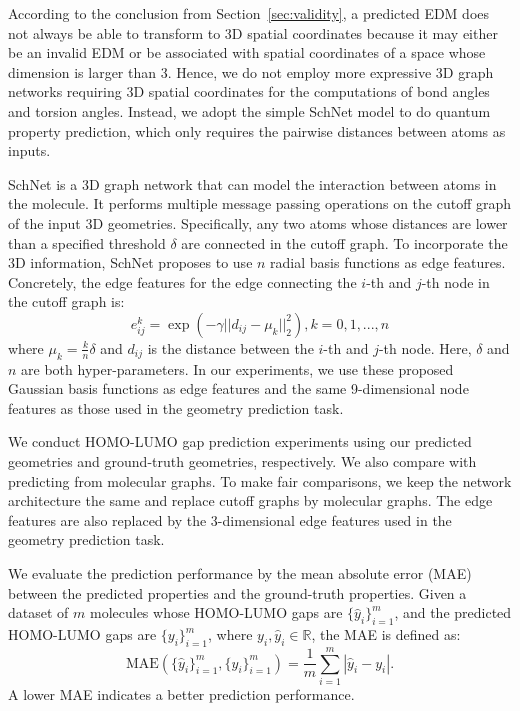 \documentclass{article}
\begin{document}
According to the conclusion from Section~\ref{sec:validity}, a predicted EDM does not always be able to transform to 3D spatial coordinates because it may either be an invalid EDM or be associated with spatial coordinates of a space whose dimension is larger than 3. Hence, we do not employ more expressive 3D graph networks requiring 3D spatial coordinates for the computations of bond angles and torsion angles. Instead,  we adopt the simple SchNet \cite{schutt2017schnet} model to do quantum property prediction, which only requires the pairwise distances between atoms as inputs.

SchNet is a 3D graph network that can model the interaction between atoms in the molecule. It performs multiple message passing operations on the cutoff graph of the input 3D geometries. Specifically, any two atoms whose distances are lower than a specified threshold $\delta$ are connected in the cutoff graph. To incorporate the 3D information, SchNet proposes to use $n$ radial basis functions as edge features. Concretely, the edge features for the edge connecting the $i$-th and $j$-th node in the cutoff graph is:
\begin{equation}
	e_{ij}^k=\exp\left(-\gamma ||d_{ij}-\mu_k||_2^2\right), k=0,1,...,n
\end{equation}
where $\mu_k=\frac{k}{n}\delta$ and $d_{ij}$ is the distance between the $i$-th and $j$-th node. Here, $\delta$ and $n$ are both hyper-parameters. In our experiments, we use these proposed Gaussian basis functions as edge features and the same 9-dimensional node features as those used in the geometry prediction task.

We conduct HOMO-LUMO gap prediction experiments using our predicted geometries and ground-truth geometries, respectively. We also compare with predicting from molecular graphs. To make fair comparisons, we keep the network architecture the same and replace cutoff graphs by molecular graphs. The edge features are also replaced by the 3-dimensional edge features used in the geometry prediction task.

We evaluate the prediction performance by the mean absolute error (MAE) between the predicted properties and the ground-truth properties. Given a dataset of $m$ molecules whose HOMO-LUMO gaps are $\{\hat{y}_i\}_{i=1}^m$, and the predicted HOMO-LUMO gaps are $\{y_i\}_{i=1}^m$, where $y_i, \hat{y}_i\in\mathbb{R}$, the MAE is defined as:
\begin{equation}
	\mbox{MAE}\left(\{\hat{y}_i\}_{i=1}^m, \{y_i\}_{i=1}^m\right)=\frac{1}{m}\sum_{i=1}^{m}|\hat{y}_i-y_i|.
\end{equation}
A lower MAE indicates a better prediction performance.
\end{document}
